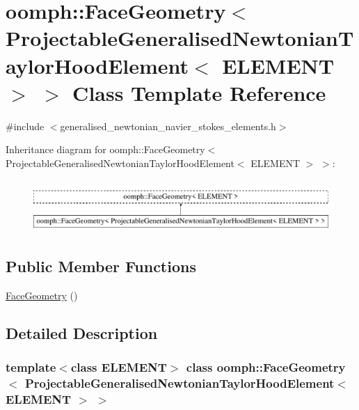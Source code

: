 \hypertarget{classoomph_1_1FaceGeometry_3_01ProjectableGeneralisedNewtonianTaylorHoodElement_3_01ELEMENT_01_4_01_4}{}\section{oomph\+:\+:Face\+Geometry$<$ Projectable\+Generalised\+Newtonian\+Taylor\+Hood\+Element$<$ E\+L\+E\+M\+E\+NT $>$ $>$ Class Template Reference}
\label{classoomph_1_1FaceGeometry_3_01ProjectableGeneralisedNewtonianTaylorHoodElement_3_01ELEMENT_01_4_01_4}


{\ttfamily \#include $<$generalised\+\_\+newtonian\+\_\+navier\+\_\+stokes\+\_\+elements.\+h$>$}

Inheritance diagram for oomph\+:\+:Face\+Geometry$<$ Projectable\+Generalised\+Newtonian\+Taylor\+Hood\+Element$<$ E\+L\+E\+M\+E\+NT $>$ $>$\+:\begin{figure}[H]
\begin{center}
\leavevmode
\includegraphics[height=2.000000cm]{classoomph_1_1FaceGeometry_3_01ProjectableGeneralisedNewtonianTaylorHoodElement_3_01ELEMENT_01_4_01_4}
\end{center}
\end{figure}
\subsection*{Public Member Functions}
\begin{DoxyCompactItemize}
\item 
\hyperlink{classoomph_1_1FaceGeometry_3_01ProjectableGeneralisedNewtonianTaylorHoodElement_3_01ELEMENT_01_4_01_4_a376f226a24d93c705b0a5bffbd77cd12}{Face\+Geometry} ()
\end{DoxyCompactItemize}


\subsection{Detailed Description}
\subsubsection*{template$<$class E\+L\+E\+M\+E\+NT$>$\newline
class oomph\+::\+Face\+Geometry$<$ Projectable\+Generalised\+Newtonian\+Taylor\+Hood\+Element$<$ E\+L\+E\+M\+E\+N\+T $>$ $>$}

